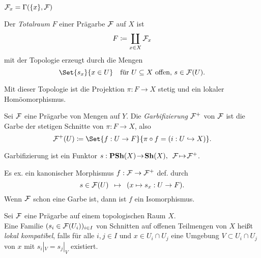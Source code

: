 \documentclass{cheat-sheet}
\begin{document}
\begin{beob}
  $\mathcal{F}_x = \Gamma(\{x\}, \mathcal{F})$
\end{beob}

\begin{defn}
  Der \emph{Totalraum} $F$ einer Prägarbe $\mathcal{F}$ auf $X$ ist
  \[ F \coloneqq \coprod_{x \in X} \mathcal{F}_x \]
  mit der Topologie erzeugt durch die Mengen
  \[
    \Set{s_x}{ x \in U } \quad
    \text{für $U \subseteq X$ offen, $s \in \Fais(U)$.}
  \]
\end{defn}

\begin{bem}
  Mit dieser Topologie ist die Projektion $\pi : F \to X$ stetig und ein lokaler Homöomorphismus.
\end{bem}

\begin{defn}
  Sei $\mathcal{F}$ eine Prägarbe von Mengen auf $Y$. Die \emph{Garbifizierung} $\mathcal{F}^+$ von $\mathcal{F}$ ist die Garbe der stetigen Schnitte von $\pi : F \to X$, also
  \[ \Fais^+(U) \coloneqq \Set{f : U \to F}{\pi \circ f = (i : U \hookrightarrow X)}. \]
\end{defn}

\begin{bem}
  Garbifizierung ist ein Funktor $s : \mathbf{PSh}(X) \!\to\! \mathbf{Sh}(X), \enspace \mathcal{F} \!\mapsto\! \mathcal{F}^+$.
\end{bem}

\begin{prop}
  Es ex. ein kanonischer Morphismus $f : \mathcal{F} \to \mathcal{F}^+$ def. durch
  \[ s \in \mathcal{F}(U) \enspace \mapsto \enspace (x \mapsto s_x : U \to F). \]
  Wenn $\mathcal{F}$ schon eine Garbe ist, dann ist $f$ ein Isomorphismus.
\end{prop}

\begin{defn}
  Sei $\mathcal{F}$ eine Prägarbe auf einem topologischen Raum $X$. \\
  Eine Familie $(s_i \in \mathcal{F}(U_i))_{i \in I}$ von Schnitten auf offenen Teilmengen von $X$ heißt \emph{lokal kompatibel}, falls für alle $i, j \in I$ und $x \in U_i \cap U_j$ eine Umgebung $V \subset U_i \cap U_j$ von $x$ mit $s_i|_V = s_j|_V$ existiert.
\end{defn}
\end{document}
